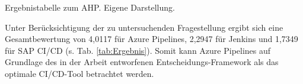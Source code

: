 \begin{center}
	\begin{table}[H]
		\centering
		\caption[Ergebnistabelle zum AHP]{Ergebnistabelle zum AHP. Eigene Darstellung.}
		\label{tab:Ergebnis}
	\end{table}
\end{center}
\vspace*{-15mm}
Unter Berücksichtigung der zu untersuchenden Fragestellung ergibt sich eine Gesamtbewertung von 4,0117 für Azure Pipelines, 2,2947 für Jenkins und 1,7349 für SAP CI/CD (s. Tab. \ref{tab:Ergebnis}). Somit kann Azure Pipelines auf Grundlage des in der Arbeit entworfenen Entscheidungs-Framework als das optimale CI/CD-Tool betrachtet werden.  

